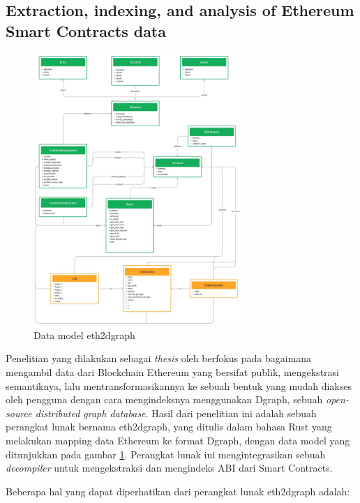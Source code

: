 \subsection{Extraction, indexing, and analysis of Ethereum Smart Contracts data}
\label{subsec:extraction-indexing-analysis-ethereum-sc}

\begin{figure}[ht]
	\centering
	\includegraphics[width=0.7\textwidth]{resources/chapter-2/eth2dgraph-structure.jpg}
	\caption{Data model eth2dgraph \parencite{aimar2023extraction}}
	\label{image:eth2dgraph-structure}
\end{figure}

Penelitian yang dilakukan sebagai \textit{thesis} oleh \cite{aimar2023extraction} berfokus pada bagaimana mengambil data dari Blockchain Ethereum yang bersifat publik, mengekstrasi semantiknya, lalu mentransformasikannya ke sebuah bentuk yang mudah diakses oleh pengguna dengan cara mengindeksnya menggunakan Dgraph, sebuah \textit{open-source distributed graph database}. Hasil dari penelitian ini adalah sebuah perangkat lunak bernama eth2dgraph, yang ditulis dalam bahasa Rust yang melakukan mapping data Ethereum ke format Dgraph, dengan data model yang ditunjukkan pada gambar \ref{image:eth2dgraph-structure}. Perangkat lunak ini mengintegrasikan sebuah \textit{decompiler} untuk mengekstraksi dan mengindeks ABI dari Smart Contracts.

Beberapa hal yang dapat diperhatikan dari perangkat lunak eth2dgraph adalah:

